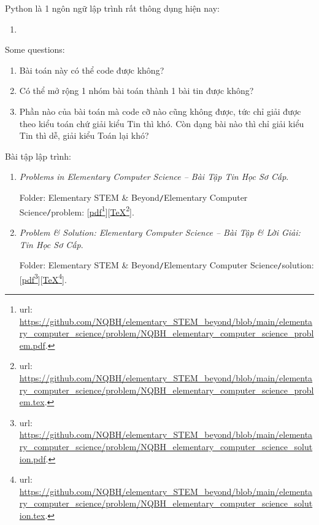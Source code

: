\documentclass[12pt,twoside]{book}
\begin{document}
Python là 1 ngôn ngữ lập trình rất thông dụng hiện nay:

\begin{enumerate}
	\item 
\end{enumerate}


Some questions:
\begin{enumerate}
	\item Bài toán này có thể code được không?
	\item Có thể mở rộng 1 nhóm bài toán thành 1 bài tin được không?
	\item Phần nào của bài toán mà code cỡ nào cũng không được, tức chỉ giải được theo kiểu toán chứ giải kiểu Tin thì khó. Còn dạng bài nào thì chỉ giải kiểu Tin thì dễ, giải kiểu Toán lại khó?
\end{enumerate}
Bài tập lập trình:
\begin{enumerate}
	\item {\it Problems in Elementary Computer Science -- Bài Tập Tin Học Sơ Cấp}.
	
	Folder: {\sf Elementary STEM \& Beyond{\tt/}Elementary Computer Science{\tt/}problem}: [\href{https://github.com/NQBH/elementary_STEM_beyond/blob/main/elementary_computer_science/problem/NQBH_elementary_computer_science_problem.pdf}{pdf}\footnote{{\sc url}: \url{https://github.com/NQBH/elementary_STEM_beyond/blob/main/elementary_computer_science/problem/NQBH_elementary_computer_science_problem.pdf}.}][\href{https://github.com/NQBH/elementary_STEM_beyond/blob/main/elementary_computer_science/problem/NQBH_elementary_computer_science_problem.tex}{\TeX}\footnote{{\sc url}: \url{https://github.com/NQBH/elementary_STEM_beyond/blob/main/elementary_computer_science/problem/NQBH_elementary_computer_science_problem.tex}.}].
	\item {\it Problem \& Solution: Elementary Computer Science -- Bài Tập \& Lời Giải: Tin Học Sơ Cấp}.
	
	Folder: {\sf Elementary STEM \& Beyond{\tt/}Elementary Computer Science{\tt/}solution}: [\href{https://github.com/NQBH/elementary_STEM_beyond/blob/main/elementary_computer_science/problem/NQBH_elementary_computer_science_solution.pdf}{pdf}\footnote{{\sc url}: \url{https://github.com/NQBH/elementary_STEM_beyond/blob/main/elementary_computer_science/problem/NQBH_elementary_computer_science_solution.pdf}.}][\href{https://github.com/NQBH/elementary_STEM_beyond/blob/main/elementary_computer_science/problem/NQBH_elementary_computer_science_solution.tex}{\TeX}\footnote{{\sc url}: \url{https://github.com/NQBH/elementary_STEM_beyond/blob/main/elementary_computer_science/problem/NQBH_elementary_computer_science_solution.tex}.}].
\end{enumerate}
\end{document}
